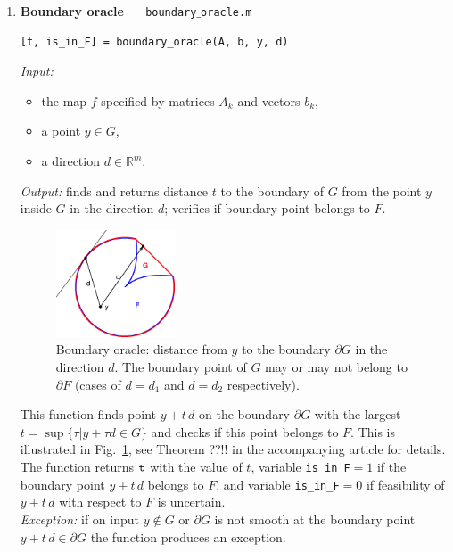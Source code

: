 \documentclass[a4paper]{article}
\newcommand{\R}{\mathbb{R}}
\theoremstyle{definition}
\begin{document}
\begin{enumerate}
\item {\bf Boundary oracle\ \ \  }{\tt \large boundary$\_$oracle.m}
\begin{verbatim}
[t, is_in_F] = boundary_oracle(A, b, y, d)
\end{verbatim}
{\it Input:}
\begin{itemize}
	\item the map $f$ specified by matrices $A_k$ and vectors $b_k$,
	\item a point $y\in G$,
	\item a direction $d\in\R^m$.
\end{itemize}
{\it Output:}  finds and returns distance $t$ to the boundary of $G$ from the point $y$ inside $G$ in the direction $d$; verifies if boundary point belongs to $F$. 


\begin{figure}[H]
	\centering\includegraphics[width=100pt]{fig/boundary_oracle}
	\caption{Boundary oracle: distance from $y$ to the boundary $\partial G$ in the direction $d$. The boundary point of $G$ may or may not belong to $\partial F$ (cases of $d=d_1$ and $d=d_2$ respectively).}
\label{fig:two}
\end{figure}


This function finds point $y+t\,d$ on the boundary $\partial G$ with the largest $ {t} = \sup\{\tau\big| y+\tau d\in G\}$ and checks if this point belongs to $F$. 
This is illustrated in Fig.~\ref{fig:two}, see Theorem ??!! in the accompanying article for details. The function returns $\tt t$ with the value of $t$, variable
	{\tt  is\_in\_F}$=1$ if the boundary point $y+t\,d$ belongs to $F$, and variable {\tt  is\_in\_F}$=0$ if feasibility of $y+t\,d$ with respect to $F$ is uncertain.\\
{\it Exception:}  if on input $y\notin G$ or $\partial G$ is not smooth at the boundary point $y+t\,d\in \partial G$ the function produces an exception. 




\end{enumerate}
\end{document}
